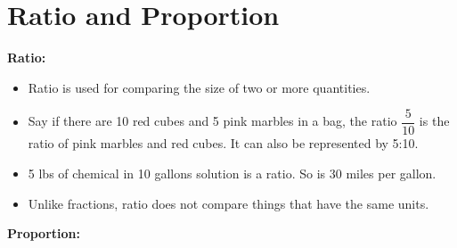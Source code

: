 \section{Ratio and Proportion}
\textbf{Ratio:}\\
\begin{itemize}
\item Ratio is used for comparing the size of two or more quantities.
\item Say if there are 10 red cubes and 5 pink marbles in a bag, the ratio $\dfrac{5}{10}$ is the ratio of pink marbles and red cubes.  It can also be represented by 5:10.
\item 5 lbs of chemical in 10 gallons solution is a ratio.  So is 30 miles per gallon.
\item Unlike fractions, ratio does not compare things that have the same units.
\end{itemize}
\textbf{Proportion:}\\
